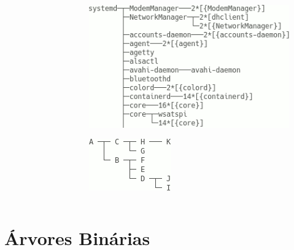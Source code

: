 \documentclass[aspectratio=169]{beamer}
\begin{document}
\begin{frame}[fragile]
\begin{columns}
\begin{column}{0.6\linewidth}
\begin{enumerate}
\begin{figure}[h]
\end{figure}
\end{enumerate}
\end{column}
\begin{column}{0.4\linewidth}
\begin{figure}[h]
	\centering
	\includegraphics[height=0.4\paperheight]{imagens/pstree.png}
\end{figure}
\vspace{3mm}
\begin{figure}[h]
	\centering
	\includegraphics[height=0.15\paperheight]{imagens/strtree.png}
\end{figure}
\end{column}
\end{columns}
\end{frame}

\section{Árvores Binárias}
\end{document}

